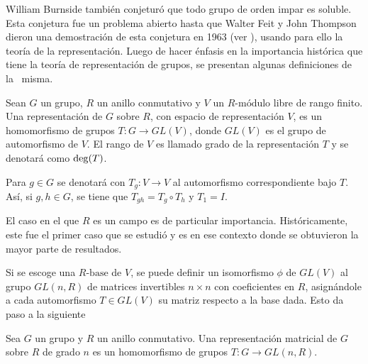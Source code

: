 William Burnside también conjeturó que todo grupo de orden impar es soluble. Esta conjetura fue un problema abierto hasta que Walter Feit y John Thompson dieron una demostración de esta conjetura en 1963 (ver \cite{bib:solubilidad}), usando para ello la teoría de la representación. Luego de hacer énfasis en la importancia histórica que tiene la teoría de representación de grupos, se presentan algunas definiciones de la~ misma.
\begin{definicion}
Sean $G$ un grupo, $R$ un anillo conmutativo y $V$ un $R\mbox{-módulo}$ libre de rango finito. Una representación de $G$ sobre $R$, con espacio de representación $V$, es un homomorfismo de grupos $T \colon G \to GL(V)$, donde $GL(V)$ es el grupo de automorfismo de $V$. El rango de $V$ es llamado grado de la representación $T$ y se denotará como $\operatorname{deg}(T)$.
\end{definicion}

Para $g \in G$ se denotará con $T_g \colon V \to V$ al automorfismo correspondiente bajo $T$. Así, si $g, h \in G$, se tiene que $T_{gh} = T_g \circ T_h$ y $T_1 = I$.

El caso en el que $R$ es un campo es de particular importancia. Históricamente, este fue el primer caso que se estudió y es en ese contexto donde se obtuvieron la mayor parte de resultados. 

Si se escoge una $R\mbox{-base}$ de $V$, se puede definir un isomorfismo $\phi$ de $GL(V)$ al grupo $GL(n,R)$ de matrices invertibles $n\times n$ con coeficientes en $R$, asignándole a cada automorfismo $T \in GL(V)$ su matriz respecto a la base dada. Esto da paso a la siguiente

\begin{definicion}
Sea $G$ un grupo y $R$ un anillo conmutativo. Una representación matricial de $G$ sobre $R$ de grado $n$ es un homomorfismo de grupos $T \colon G \to GL(n,R)$.
\end{definicion} 

